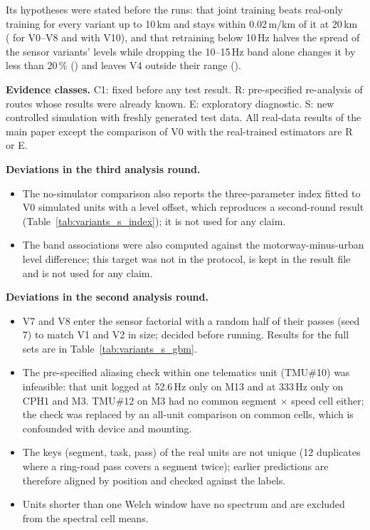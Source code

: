 \documentclass[onecolumn,10pt]{IEEEtran}
\begin{document}
Its hypotheses were stated before the runs: that joint training beats real-only training for every variant up to 10\,km and stays within 0.02\,m/km of it at 20\,km (\poHoneMeas{} for V0--V8 and \poHoneAll{} with V10), and that retraining below 10\,Hz halves the spread of the sensor variants' levels while dropping the 10--15\,Hz band alone changes it by less than 20\,\% (\blHthreeHolds) and leaves V4 outside their range (\blHthreeBHolds).

\textbf{Evidence classes.}
C1: fixed before any test result. R: pre-specified re-analysis of routes whose results were already known. E: exploratory diagnostic. S: new controlled simulation with freshly generated test data.
All real-data results of the main paper except the comparison of V0 with the real-trained estimators are R or E.

\textbf{Deviations in the third analysis round.}
\begin{itemize}
\item The no-simulator comparison also reports the three-parameter index fitted to V0 simulated units with a level offset, which reproduces a second-round result (Table~\ref{tab:variants_s_index}); it is not used for any claim.
\item The band associations were also computed against the motorway-minus-urban level difference; this target was not in the protocol, is kept in the result file and is not used for any claim.
\end{itemize}

\textbf{Deviations in the second analysis round.}
\begin{itemize}
\item V7 and V8 enter the sensor factorial with a random half of their passes (seed 7) to match V1 and V2 in size; decided before running. Results for the full sets are in Table~\ref{tab:variants_s_gbm}.
\item The pre-specified aliasing check within one telematics unit (TMU\#10) was infeasible: that unit logged at 52.6\,Hz only on M13 and at 333\,Hz only on CPH1 and M3. TMU\#12 on M3 had no common segment $\times$ speed cell either; the check was replaced by an all-unit comparison on common cells, which is confounded with device and mounting.
\item The keys (segment, task, pass) of the real units are not unique (12 duplicates where a ring-road pass covers a segment twice); earlier predictions are therefore aligned by position and checked against the labels.
\item Units shorter than one Welch window have no spectrum and are excluded from the spectral cell means.
\end{itemize}
\end{document}
